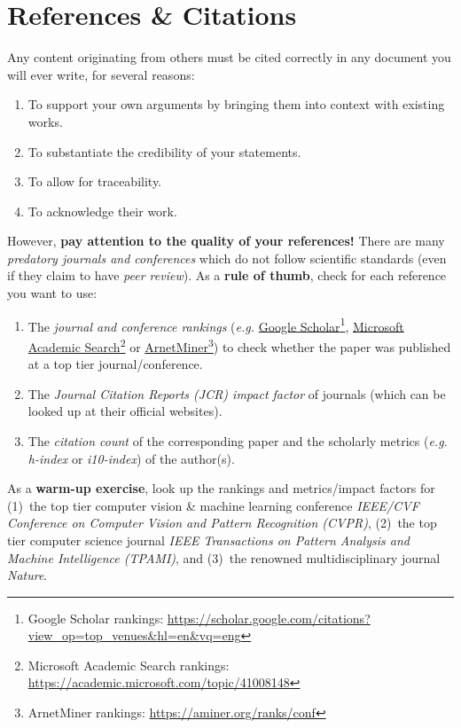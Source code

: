 \documentclass[11pt,a4paper]{article}
\begin{document}
\newpage
\section{References \& Citations}
\label{sec-references}

Any content originating from others must be cited correctly in any document you will ever write, for several reasons:
\begin{enumerate}
  \item To support your own arguments by bringing them into context with existing works.
  \item To substantiate the credibility of your statements.
  \item To allow for traceability.
  \item To acknowledge their work.
\end{enumerate}
However, \textbf{pay attention to the quality of your references!}
There are many \emph{predatory journals and conferences} which do not follow scientific standards (even if they claim to have \emph{peer review}). As a \textbf{rule of thumb}, check for each reference you want to use:
\begin{enumerate}
  \item The \emph{journal and conference rankings} (\emph{e.g.} \href{https://scholar.google.com/citations?view_op=top_venues&hl=en&vq=eng}{Google Scholar}\footnote{Google Scholar rankings: \url{https://scholar.google.com/citations?view_op=top_venues&hl=en&vq=eng}}, \href{https://academic.microsoft.com/topic/41008148}{Microsoft Academic Search}\footnote{Microsoft Academic Search rankings: \url{https://academic.microsoft.com/topic/41008148}} or \href{https://aminer.org/ranks/conf}{ArnetMiner}\footnote{ArnetMiner rankings: \url{https://aminer.org/ranks/conf}}) to check whether the paper was published at a top tier journal/conference.
  \item The \emph{Journal Citation Reports (JCR) impact factor} of journals (which can be looked up at their official websites). 
  \item The \emph{citation count} of the corresponding paper and the scholarly metrics (\emph{e.g.} \emph{h-index} or \emph{i10-index}) of the author(s).
\end{enumerate}
As a \textbf{warm-up exercise}, look up the rankings and metrics/impact factors for (1)~the top tier computer vision \& machine learning conference \emph{IEEE/CVF Conference on Computer Vision and Pattern Recognition (CVPR)}, (2)~the top tier computer science journal \emph{IEEE Transactions on Pattern Analysis and Machine Intelligence (TPAMI)}, and (3)~the renowned multidisciplinary journal \emph{Nature}.
\end{document}
